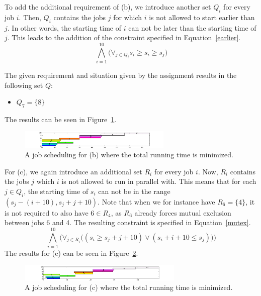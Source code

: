 To add the additional requirement of (b), we introduce another set $Q_i$ for every job $i$. Then, $Q_i$ contains the jobs $j$ for which $i$ is not allowed to start earlier than $j$. In other words, the starting time of $i$ can not be later than the starting time of $j$. This leads to the addition of the constraint specified in Equation~\ref{earlier}.
\begin{equation}
    \label{earlier}
    \bigwedge^{10}_{i=1}\big(\forall_{j\in Q_i} s_i \geq s_i \geq s_j \big)
\end{equation}

The given requirement and situation given by the assignment results in the following set $Q$:
\begin{itemize}
    \item $Q_7 = \{8\}$
\end{itemize}
The results can be seen in Figure~\ref{fig:3b}.
\begin{figure}[H]
    \centering
    \hspace*{-1cm}
    \includegraphics[width=0.65\textwidth]{3/b.pdf}
    \caption{A job scheduling for (b) where the total running time is minimized.}
    \label{fig:3b}
\end{figure}

For (c), we again introduce an additional set $R_i$ for every job $i$. Now, $R_i$ contains the jobs $j$ which $i$ is not allowed to run in parallel with. This means that for each $j \in Q_i$, the starting time of $s_i$ can not be in the range $(s_j - (i + 10), s_j + j + 10)$. Note that when we for instance have $R_6 = \{4\}$, it is not required to also have $6 \in R_4$, as $R_6$ already forces mutual exclusion between jobs 6 and 4. The resulting constraint is specified in Equation~\ref{mutex}.
\begin{equation}
    \label{mutex}
    \bigwedge^{10}_{i=1}\bigg(\forall_{j \in R_i}\big((s_i \geq s_j + j + 10) \vee (s_i + i + 10 \leq s_j)\big)\bigg)
\end{equation}
The results for (c) can be seen in Figure~\ref{fig:3c}.
\begin{figure}[H]
    \centering
    \hspace*{-1cm}
    \includegraphics[width=0.7\textwidth]{3/c.pdf}
    \caption{A job scheduling for (c) where the total running time is minimized.}
    \label{fig:3c}
\end{figure}